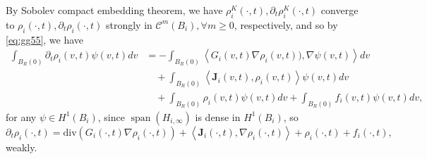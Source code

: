 \documentclass[a4paper, 11pt]{article}
\newcommand{\inner}[2]{\left< #1 , #2 \right>}
\theoremstyle{plain}
\theoremstyle{remark}
\theoremstyle{definition}
\renewcommand{\div}{\mathrm{div}}
\newcommand{\intr}{\int_{B_R(0)}}
\newcommand{\J}{\boldsymbol{J}}
\begin{document}
        By Sobolev compact embedding theorem, we have $\rho_i^K(\cdot,t),\partial_t\rho_i^K(\cdot,t)$ converge to $\rho_i(\cdot,t),\partial_t\rho_i(\cdot,t)$ strongly in $\mathcal{C}^{m}(B_i), \forall m\geq 0$, respectively, and so by \eqref{eq:gg55},  we have
				\begin{equation}\label{eq:t94}
			\begin{aligned}
				\intr \partial_t\rho_i(v,t) \psi(v,t)dv&=-\intr \inner{{G_i(v,t)}\nabla\rho_i(v,t))}{\nabla\psi(v,t)}dv\\
				&\quad+\intr \inner{\J_i(v,t)}{\rho_i(v,t)}\psi(v,t)dv\\
				&\quad +\intr\rho_i(v,t)\psi(v,t)dv+\intr f_i(v,t)\psi(v,t)dv,
			\end{aligned}
		\end{equation}
		for any $\psi\in H^1(B_i)$, since $\operatorname{span}(H_{i,\infty})$ is dense in $H^1(B_i)$, so 
		\begin{equation}\label{eq:g99}
		\partial_t\rho_i(\cdot,t)=\div(G_i(\cdot,t)\nabla\rho_i(\cdot,t))+\inner{\J_i(\cdot,t)}{\nabla\rho_i(\cdot,t)}+\rho_i(\cdot,t)+f_i(\cdot,t),
		\end{equation}
		weakly.
		
\end{document}
